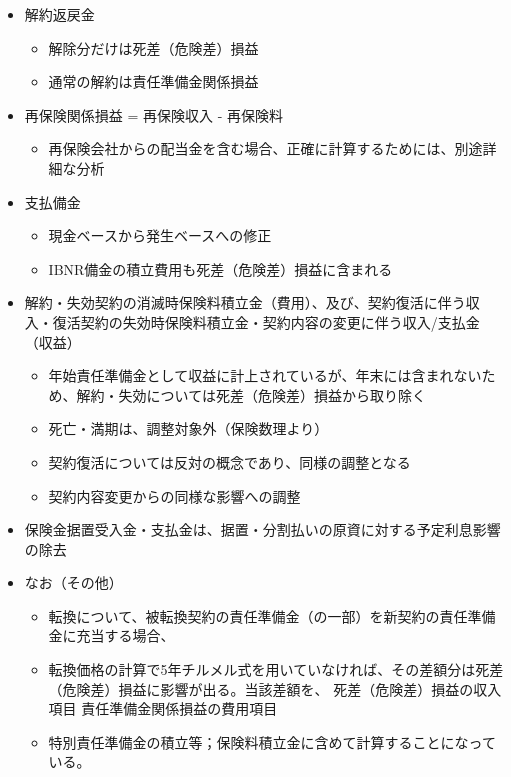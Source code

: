 \documentclass[report,gutter=10mm,fore-edge=10mm,uplatex,dvipdfmx]{jlreq}
\begin{document}
\begin{itemize}
  \begin{itemize}
  \item
    解約返戻金

    \begin{itemize}
    \tightlist
    \item
      解除分だけは死差（危険差）損益
    \item
      通常の解約は責任準備金関係損益
    \end{itemize}
  \item
    再保険関係損益 = 再保険収入 - 再保険料

    \begin{itemize}
    \tightlist
    \item
      再保険会社からの配当金を含む場合、正確に計算するためには、別途詳細な分析
    \end{itemize}
  \item
    支払備金

    \begin{itemize}
    \tightlist
    \item
      現金ベースから発生ベースへの修正
    \item
      IBNR備金の積立費用も死差（危険差）損益に含まれる
    \end{itemize}
  \item
    解約・失効契約の消滅時保険料積立金（費用）、及び、契約復活に伴う収入・復活契約の失効時保険料積立金・契約内容の変更に伴う収入/支払金（収益）

    \begin{itemize}
    \tightlist
    \item
      年始責任準備金として収益に計上されているが、年末には含まれないため、解約・失効については死差（危険差）損益から取り除く
    \item
      死亡・満期は、調整対象外（保険数理より）
    \item
      契約復活については反対の概念であり、同様の調整となる
    \item
      契約内容変更からの同様な影響への調整
    \end{itemize}
  \item
    保険金据置受入金・支払金は、据置・分割払いの原資に対する予定利息影響の除去
  \item
    なお（その他）

    \begin{itemize}
    \tightlist
    \item
      転換について、被転換契約の責任準備金（の一部）を新契約の責任準備金に充当する場合、

      \tightlist
      \item
        転換価格の計算で5年チルメル式を用いていなければ、その差額分は死差（危険差）損益に影響が出る。当該差額を、
          死差（危険差）損益の収入項目
          責任準備金関係損益の費用項目
    \item
      特別責任準備金の積立等；保険料積立金に含めて計算することになっている。
    \end{itemize}
  \end{itemize}
\end{itemize}
\end{document}
